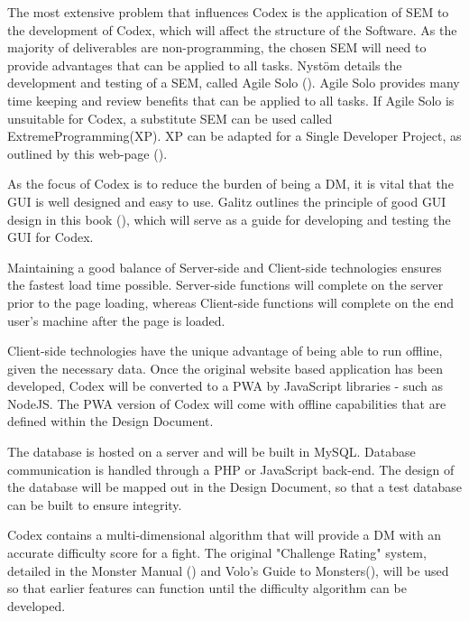 \documentclass[proposal]{cmpreport}
\begin{document}
	The most extensive problem that influences Codex is the application of SEM to the development of Codex, which will affect the structure of the Software. As the majority of deliverables are non-programming, the chosen SEM will need to provide advantages that can be applied to all tasks. Nyst{\"o}m details the development and testing of a SEM, called Agile Solo (\cite{AgileSolo}). Agile Solo provides many time keeping and review benefits that can be applied to all tasks. If Agile Solo is unsuitable for Codex, a substitute SEM can be used called ExtremeProgramming(XP). XP can be adapted for a Single Developer Project, as outlined by this web-page (\cite{SoloXP}).
	
	As the focus of Codex is to reduce the burden of being a DM, it is vital that the GUI is well designed and easy to use. Galitz outlines the principle of good GUI design in this book (\cite{GUIDesign}), which will serve as a guide for developing and testing the GUI for Codex.
		
	Maintaining a good balance of Server-side and Client-side technologies ensures the fastest load time possible. Server-side functions will complete on the server prior to the page loading, whereas Client-side functions will complete on the end user's machine after the page is loaded.
	
	Client-side technologies have the unique advantage of being able to run offline, given the necessary data. Once the original website based application has been developed, Codex will be converted to a PWA by JavaScript libraries - such as NodeJS. The PWA version of Codex will come with offline capabilities that are defined within the Design Document.
	
	The database is hosted on a server and will be built in MySQL. Database communication is handled through a PHP or JavaScript back-end. The design of the database will be mapped out in the Design Document, so that a test database can be built to ensure integrity. 
	
	Codex contains a multi-dimensional algorithm that will provide a DM with an accurate difficulty score for a fight. The original "Challenge Rating" system, detailed in the Monster Manual (\cite{MonsterManual}) and Volo's Guide to Monsters(\cite{Volos}), will be used so that earlier features can function until the difficulty algorithm can be developed. 
	
\end{document}
